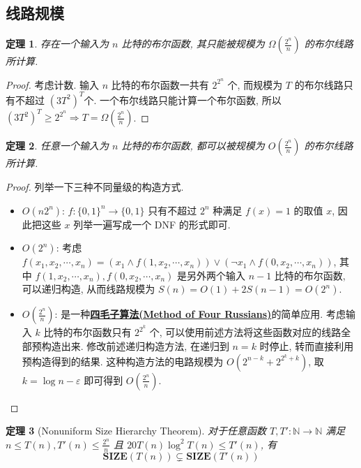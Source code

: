 \documentclass[8pt]{article}
\theoremstyle{compact}
\newtheorem{theorem}{定理}[section]
\def\obj#1{\textbf{\uline{#1}}}
\def\le{\leqslant}
\def\ge{\geqslant}
\def\SIZE{\textbf{SIZE}}
\begin{document}
\subsection{线路规模}
\begin{theorem}
	存在一个输入为 $n$ 比特的布尔函数, 其只能被规模为 $\Omega\left(\frac{2^n}{n}\right)$ 的布尔线路所计算.
\end{theorem}
\begin{proof}
	考虑计数. 输入 $n$ 比特的布尔函数一共有 $2^{2^n}$ 个, 而规模为 $T$ 的布尔线路只有不超过 $\left(3T^2\right)^T$个. 一个布尔线路只能计算一个布尔函数, 所以 $(3T^2)^T \ge 2^{2^n} \Rightarrow T = \Omega(\frac{2^n}{n})$.
\end{proof}
\begin{theorem}
	任意一个输入为 $n$ 比特的布尔函数, 都可以被规模为 $O\left(\frac{2^n}{n}\right)$ 的布尔线路所计算.
\end{theorem}
\begin{proof}
	列举一下三种不同量级的构造方式.
	\begin{itemize}
		\item $O(n2^n)$: $f: \{0, 1\}^n \to \{0, 1\}$ 只有不超过 $2^n$ 种满足 $f(x) = 1$ 的取值 $x$, 因此把这些 $x$ 列举一遍写成一个 DNF 的形式即可.
		\item $O(2^n)$: 考虑 $f(x_1, x_2, \cdots, x_n) = (x_1 \wedge f(1, x_2, \cdots, x_n)) \vee (\lnot x_1 \wedge f(0, x_2, \cdots, x_n))$, 其中 $f(1, x_2, \cdots, x_n), f(0, x_2, \cdots, x_n)$ 是另外两个输入 $n - 1$ 比特的布尔函数, 可以递归构造, 从而线路规模为 $S(n) = O(1) + 2S(n - 1) = O(2^n)$.
		\item $O\left(\frac{2^n}{n}\right)$: 是一种\obj{四毛子算法(Method of Four Russians)}的简单应用. 考虑输入 $k$ 比特的布尔函数只有 $2^{2^k}$ 个, 可以使用前述方法将这些函数对应的线路全部预构造出来. 修改前述递归构造方法, 在递归到 $n = k$ 时停止, 转而直接利用预构造得到的结果. 这种构造方法的电路规模为 $O(2^{n - k} + 2^{2^k + k})$, 取 $k = \log n - \varepsilon$ 即可得到 $O\left(\frac{2^n}{n}\right)$.
	\end{itemize}
\end{proof}
\begin{theorem}[Nonuniform Size Hierarchy Theorem]
	对于任意函数 $T, T': \mathbb N \to \mathbb N$ 满足 $n \le T(n), T'(n) \le \frac{2^n}{n}$ 且 $20T(n)\log^2 T(n) \le T'(n)$, 有 $$\SIZE(T(n)) \subsetneq \SIZE(T'(n))$$
\end{theorem}
\end{document}
